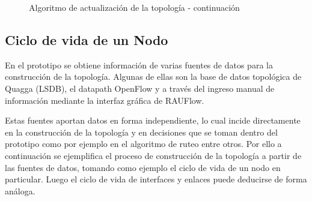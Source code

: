 \newpage
\clearpage
\begin{figure}[ht!]
\begin{algorithm}[H]
 
\end{algorithm}
\caption[]{Algoritmo de actualización de la topolog\'ia - continuaci\'on}
\end{figure}

\subsection{Ciclo de vida de un Nodo}
En el prototipo se obtiene informaci\'on de varias fuentes de datos para la construcci\'on de la topolog\'ia. Algunas de ellas son la base de datos topol\'ogica de Quagga (LSDB), el datapath OpenFlow y a través del ingreso manual de informaci\'on mediante la interfaz gr\'afica de RAUFlow.

Estas fuentes aportan datos en forma independiente, lo cual incide directamente en la construcci\'on de la topolog\'ia y en decisiones que se toman dentro del prototipo como por ejemplo en el algoritmo de ruteo entre otros. Por ello a continuaci\'on se ejemplifica el proceso de construcci\'on de la topolog\'ia a partir de las fuentes de datos, tomando como ejemplo el ciclo de vida de un nodo en particular. Luego el ciclo de vida de interfaces y enlaces puede deducirse de forma análoga.\\

